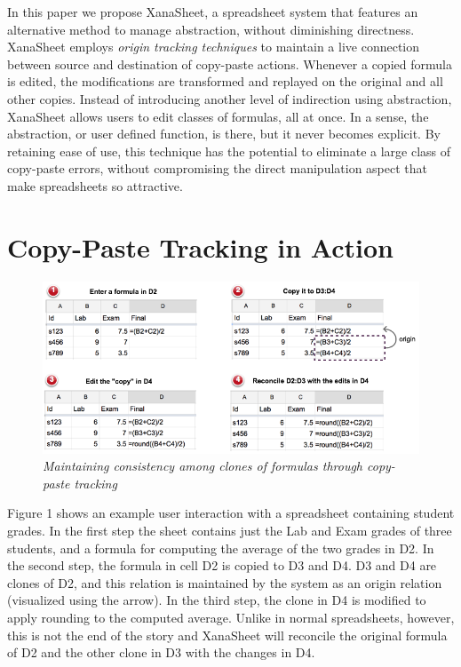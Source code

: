 \documentclass[11pt,]{article}
\begin{document}
In this paper we propose XanaSheet, a spreadsheet system that features
an alternative method to manage abstraction, without diminishing
directness. XanaSheet employs \emph{origin tracking techniques} to
maintain a live connection between source and destination of copy-paste
actions. Whenever a copied formula is edited, the modifications are
transformed and replayed on the original and all other copies. Instead
of introducing another level of indirection using abstraction, XanaSheet
allows users to edit classes of formulas, all at once. In a sense, the
abstraction, or user defined function, is there, but it never becomes
explicit. By retaining ease of use, this technique has the potential to
eliminate a large class of copy-paste errors, without compromising the
direct manipulation aspect that make spreadsheets so attractive.

\section{Copy-Paste Tracking in
Action}\label{copy-paste-tracking-in-action}

\begin{figure}[htbp]
\centering
\includegraphics{images/grades.png}
\caption{\emph{Maintaining consistency among clones of formulas through
copy-paste tracking}}
\end{figure}

Figure 1 shows an example user interaction with a spreadsheet containing
student grades. In the first step the sheet contains just the Lab and
Exam grades of three students, and a formula for computing the average
of the two grades in D2. In the second step, the formula in cell D2 is
copied to D3 and D4. D3 and D4 are clones of D2, and this relation is
maintained by the system as an origin relation (visualized using the
arrow). In the third step, the clone in D4 is modified to apply rounding
to the computed average. Unlike in normal spreadsheets, however, this is
not the end of the story and XanaSheet will reconcile the original
formula of D2 and the other clone in D3 with the changes in D4.
\end{document}
